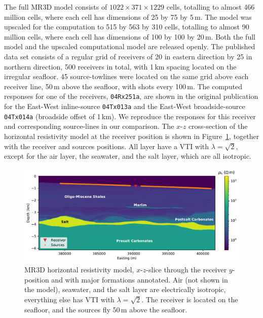 \documentclass[onecolumn,extra,camera]{gji}
\begin{document}
The full MR3D model consists of $1022 \times 371 \times 1229$ cells, totalling to almost 466 million cells, where each cell has dimensions of 25 by 75 by 5\,m. The model was upscaled for the computation to 515 by 563 by 310 cells, totalling to almost 90 million cells, where each cell has dimensions of 100 by 100 by 20\,m. Both the full model and the upscaled computational model are released openly. The published data set consists of a regular grid of receivers of 20 in eastern direction by 25 in northern direction, 500 receivers in total, with 1\,km spacing located on the irregular seafloor. 45 source-towlines were located on the same grid above each receiver line, 50\,m above the seafloor, with shots every 100\,m. The computed responses for one of the receivers, \texttt{04Rx251a}, are shown in the original publication for the East-West inline-source \texttt{04Tx013a} and the East-West broadside-source \texttt{04Tx014a} (broadside offset of 1\,km). We reproduce the responses for this receiver and corresponding source-lines in our comparison. The $x$-$z$ cross-section of the horizontal resistivity model at the receiver position is shown in Figure~\ref{fig:model-marlim}, together with the receiver and sources positions. All layer have a VTI with $\lambda=\sqrt{2}$, except for the air layer, the seawater, and the salt layer, which are all isotropic.

%
\begin{figure}
  \centering
  \includegraphics[width=.9\linewidth]{figures/model-marlim}
  \caption{MR3D horizontal resistivity model, $x$-$z$-slice through the receiver $y$-position and with major formations annotated. Air (not shown in the model), seawater, and the salt layer are electrically isotropic, everything else has VTI with $\lambda=\sqrt{2}$. The receiver is located on the seafloor, and the sources fly 50\,m above the seafloor.}
  \label{fig:model-marlim}
\end{figure}
%
\end{document}
